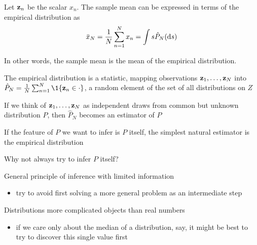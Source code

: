 \begin{frame}
    
    \vspace{2em}
    \Eg
    Let ${\mathbf z}_n$ be the scalar $x_n$. The sample mean can be expressed
    in terms of the empirical distribution as 
    \begin{equation*}
        \label{eq:hued}
        \bar x_N 
        = \frac{1}{N} \sum_{n=1}^N x_n
        = \int s \hat P_N(\mathop{}\!\mathrm{d} s)
    \end{equation*}
    
    \vspace{.7em}
    In other words, the sample mean is the mean of the empirical distribution.

\end{frame}

\begin{frame}

    \vspace{2em}
    The empirical distribution is a statistic,
    mapping observations ${\mathbf z}_1, \ldots, {\mathbf z}_N$ 
    into $\hat P_N = \frac{1}{N} \sum_{n=1}^N \1\{\boldz_n \in \cdot \}$,
    a random element of the set of all distributions on $Z$
    
    \vspace{.7em}
    If we think of ${\mathbf z}_1, \ldots, {\mathbf z}_N$ as independent draws 
    from common but unknown distribution $P$, then $\hat P_N$ becomes an
    estimator of $P$
    
    \vspace{.7em}
    If the feature of $P$
    we want to infer is $P$ itself, the simplest
    natural estimator is the empirical distribution
    
\end{frame}

\begin{frame}

    \vspace{2em}
    Why not always try to infer $P$ itself?  
    
    \vspace{.7em}
    General principle of inference with limited information 
    \begin{itemize}
        \item try to avoid first solving a more general problem
        as an intermediate step
    \end{itemize}
    
    \vspace{.7em}
    Distributions more
    complicated objects than real numbers
    \begin{itemize}
        \item if we care only about the median
        of a distribution, say, it might be best to try to discover this single value first
    \end{itemize}
\end{frame}

